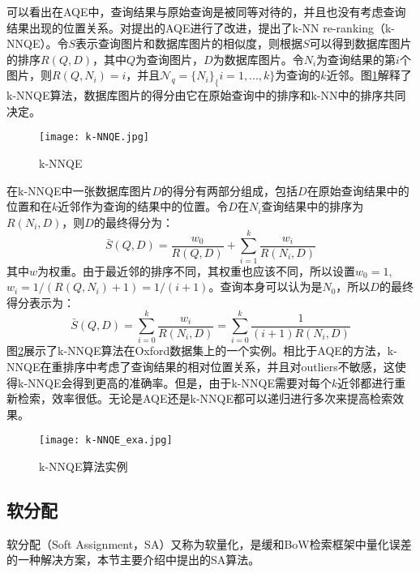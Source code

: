 可以看出在AQE中，查询结果与原始查询是被同等对待的，并且也没有考虑查询结果出现的位置关系。\cite{shen2012Object}对\cite{chum2007total}提出的AQE进行了改进，提出了k-NN re-ranking（k-NNQE）。令$S$表示查询图片和数据库图片的相似度，则根据$S$可以得到数据库图片的排序$R(Q,D)$，其中$Q$为查询图片，$D$为数据库图片。令$N_i$为查询结果的第$i$个图片，则$R(Q,N_i)=i$，并且$\mathcal{N}_q=\{N_i\}_\{i=1,...,k\}$为查询的$k$近邻。图\ref{fig:k-NNQE}解释了k-NNQE算法，数据库图片的得分由它在原始查询中的排序和k-NN中的排序共同决定。
\begin{figure}[h]
	\centering
	\texttt{[image: k-NNQE.jpg]}
	\caption{k-NNQE}\label{fig:k-NNQE}
\end{figure}
在k-NNQE中一张数据库图片$D$的得分有两部分组成，包括$D$在原始查询结果中的位置和在$k$近邻作为查询的结果中的位置。令$D$在$N_i$查询结果中的排序为$R(N_i,D)$，则$D$的最终得分为：
\begin{equation}
\bar{S}(Q,D)=\frac{w_0}{R(Q,D)}+\sum_{i=1}^{k}\frac{w_i}{R(N_i,D)}
\end{equation}
其中$w$为权重。由于最近邻的排序不同，其权重也应该不同，所以设置$w_0=1$,$w_i=1/(R(Q,N_i)+1)=1/(i+1)$。查询本身可以认为是$N_0$，所以$D$的最终得分表示为：
\begin{equation}
\bar{S}(Q,D)=\sum_{i=0}^{k}\frac{w_i}{R(N_i,D)}=\sum_{i=0}^{k}\frac{1}{(i+1)R(N_i,D)}
\end{equation}
图\ref{fig:k-NNQE_exa}展示了k-NNQE算法在Oxford数据集上\cite{philbin2007object}的一个实例。相比于AQE的方法，k-NNQE在重排序中考虑了查询结果的相对位置关系，并且对outliers不敏感，这使得k-NNQE会得到更高的准确率。但是，由于k-NNQE需要对每个$k$近邻都进行重新检索，效率很低。无论是AQE还是k-NNQE都可以递归进行多次来提高检索效果。
\begin{figure}[h]
	\centering
	\texttt{[image: k-NNQE\_exa.jpg]}
	\caption{k-NNQE算法实例}\label{fig:k-NNQE_exa}
\end{figure}

\subsection{软分配}
软分配（Soft Assignment，SA）又称为软量化，是缓和BoW检索框架中量化误差的一种解决方案，本节主要介绍\cite{philbin2008lost}中提出的SA算法。

